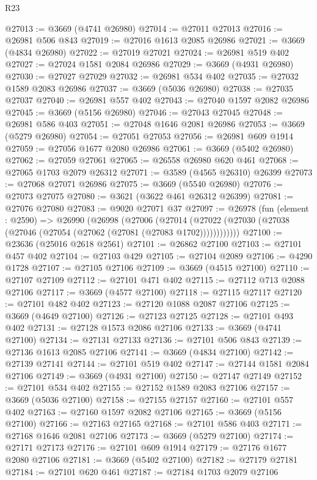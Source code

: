 \begin{lexlean}{R23}
\begin{coremodule}
@27013 := @3669 (@4741 @26980)
@27014 := @27011 @27013
@27016 := @26981 @506 @843
@27019 := @27016 @1613 @2085 @26986
@27021 := @3669 (@4834 @26980)
@27022 := @27019 @27021
@27024 := @26981 @519 @402
@27027 := @27024 @1581 @2084 @26986
@27029 := @3669 (@4931 @26980)
@27030 := @27027 @27029
@27032 := @26981 @534 @402
@27035 := @27032 @1589 @2083 @26986
@27037 := @3669 (@5036 @26980)
@27038 := @27035 @27037
@27040 := @26981 @557 @402
@27043 := @27040 @1597 @2082 @26986
@27045 := @3669 (@5156 @26980)
@27046 := @27043 @27045
@27048 := @26981 @586 @403
@27051 := @27048 @1646 @2081 @26986
@27053 := @3669 (@5279 @26980)
@27054 := @27051 @27053
@27056 := @26981 @609 @1914
@27059 := @27056 @1677 @2080 @26986
@27061 := @3669 (@5402 @26980)
@27062 := @27059 @27061
@27065 := @26558 @26980 @620 @461
@27068 := @27065 @1703 @2079 @26312
@27071 := @3589 (@4565 @26310) @26399
@27073 := @27068 @27071 @26986
@27075 := @3669 (@5540 @26980)
@27076 := @27073 @27075
@27080 := @3621 (@3622 @461 @26312 @26399)
@27081 := @27076 @27080
@27083 := @9020 @27071 @37
@27097 := @26978
    (fun (element : @2590) =>
    @26990
      (@26998
        (@27006
          (@27014 (@27022 (@27030 (@27038 (@27046 (@27054 (@27062 (@27081 (@27083 @1702))))))))))))
@27100 := @23636 (@25016 @2618 @2561)
@27101 := @26862 @27100
@27103 := @27101 @457 @402
@27104 := @27103 @429
@27105 := @27104 @2089
@27106 := @4290 @1728
@27107 := @27105 @27106
@27109 := @3669 (@4515 @27100)
@27110 := @27107 @27109
@27112 := @27101 @471 @402
@27115 := @27112 @713 @2088 @27106
@27117 := @3669 (@4577 @27100)
@27118 := @27115 @27117
@27120 := @27101 @482 @402
@27123 := @27120 @1088 @2087 @27106
@27125 := @3669 (@4649 @27100)
@27126 := @27123 @27125
@27128 := @27101 @493 @402
@27131 := @27128 @1573 @2086 @27106
@27133 := @3669 (@4741 @27100)
@27134 := @27131 @27133
@27136 := @27101 @506 @843
@27139 := @27136 @1613 @2085 @27106
@27141 := @3669 (@4834 @27100)
@27142 := @27139 @27141
@27144 := @27101 @519 @402
@27147 := @27144 @1581 @2084 @27106
@27149 := @3669 (@4931 @27100)
@27150 := @27147 @27149
@27152 := @27101 @534 @402
@27155 := @27152 @1589 @2083 @27106
@27157 := @3669 (@5036 @27100)
@27158 := @27155 @27157
@27160 := @27101 @557 @402
@27163 := @27160 @1597 @2082 @27106
@27165 := @3669 (@5156 @27100)
@27166 := @27163 @27165
@27168 := @27101 @586 @403
@27171 := @27168 @1646 @2081 @27106
@27173 := @3669 (@5279 @27100)
@27174 := @27171 @27173
@27176 := @27101 @609 @1914
@27179 := @27176 @1677 @2080 @27106
@27181 := @3669 (@5402 @27100)
@27182 := @27179 @27181
@27184 := @27101 @620 @461
@27187 := @27184 @1703 @2079 @27106

\end{coremodule}
\end{lexlean}
